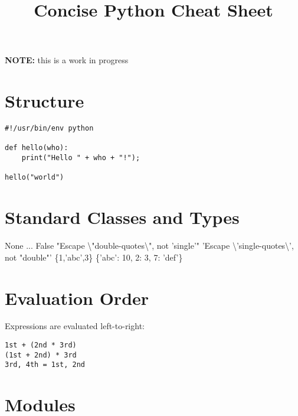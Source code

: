 \documentclass{refcard}
\title{Concise Python Cheat Sheet}
\begin{document}
\maketitle

\begin{center}
{\Large\textbf{NOTE:} this is a work in progress}
\end{center}

\section{Structure}

\begin{verbatim}
#!/usr/bin/env python

def hello(who):
    print("Hello " + who + "!");

hello("world")
\end{verbatim}



\section{Standard Classes and Types}


\begin{ldesc}
	\li[\C{NoneType}]  None
	\li[\C{ellipsis}]  ...
	\li[\C{bool}]      False
	\li[\C{str}]       "Escape \textbackslash{}"double-quotes\textbackslash{}", not 'single'"
	\li[\C{str}]       'Escape \textbackslash{}'single-quotes\textbackslash{}', not "double"'
	\li[\C{list}]      [360,'abc',3.141,360]
	\li[\C{set}]       \{1,'abc',3\}
	\li[\C{dict}]      \{'abc': 10, 2: 3, 7: 'def'\}
\end{ldesc}

\section{Evaluation Order}

Expressions are evaluated left-to-right:
\begin{verbatim}
1st + (2nd * 3rd)
(1st + 2nd) * 3rd
3rd, 4th = 1st, 2nd
\end{verbatim}

\section{Modules}
\end{document}
